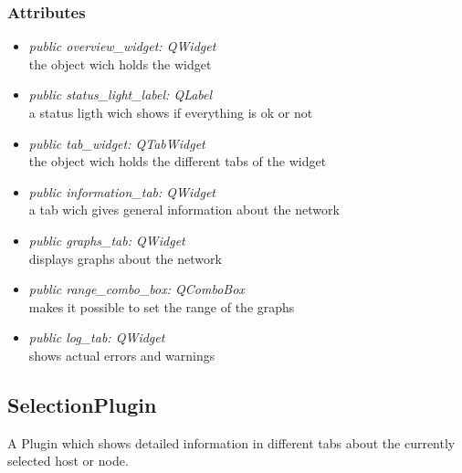 \subsubsection{Attributes}
\begin{itemize}
  \item \textit{public overview\_widget: QWidget}\\
  the object wich holds the widget
  \item \textit{public status\_light\_label: QLabel}\\
  a status ligth wich shows if everything is ok or not
  \item \textit{public tab\_widget: QTabWidget}\\
  the object wich holds the different tabs of the widget
  \item \textit{public information\_tab: QWidget}\\
  a tab wich gives general information about the network 
  \item \textit{public graphs\_tab: QWidget}\\
  displays graphs about the network
  \item \textit{public range\_combo\_box: QComboBox}\\
  makes it possible to set the range of the graphs
  \item \textit{public log\_tab: QWidget}\\
  shows actual errors and warnings 
\end{itemize}

\subsection{SelectionPlugin}
A Plugin which shows detailed information in different tabs about the currently
selected host or node.
